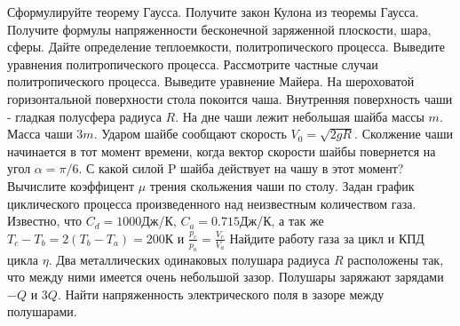 \documentclass[a5paper, landscape]{exam}
\begin{document}
			\firstpageheadrule
{}
\vspace*{0.15cm}
\begin{questions}
\question	Сформулируйте теорему Гаусса. Получите закон Кулона из теоремы Гаусса. Получите формулы напряженности бесконечной заряженной плоскости, шара, сферы.
\question Дайте определение теплоемкости, политропического процесса. Выведите уравнения политропического процесса. Рассмотрите частные случаи политропического процесса. Выведите уравнение Майера.
\question На шероховатой горизонтальной поверхности стола покоится чаша. Внутренняя поверхность чаши - гладкая полусфера радиуса $R$. На дне чаши лежит небольшая шайба массы $m$. Масса чаши $3m$. Ударом шайбе сообщают скорость $V_0 = \sqrt{2gR}$. Сколжение чаши начинается в тот момент времени, когда вектор скорости шайбы повернется на угол $\alpha = \pi/6$. С какой силой P шайба действует на чашу в этот момент? Вычислите коэффицент $\mu$ трения скольжения чаши по столу.
\question Задан график циклического процесса произведенного над неизвестным количеством газа. Известно, что $C_d = 1000 $Дж/К, $C_a = 0.715$Дж/К, а так же $T_c - T_b = 2 (T_b - T_a)=200$К и $\frac{p_c}{p_a}=\frac{V_c}{V_a}$ Найдите работу газа за цикл и КПД цикла $\eta$.
\question Два металлических одинаковых полушара радиуса $R$ расположены так, что между ними имеется очень небольшой зазор. Полушары заряжают зарядами $-Q$ и $3Q$. Найти напряженность электрического поля в зазоре между полушарами.
\end{questions}
\end{document}
